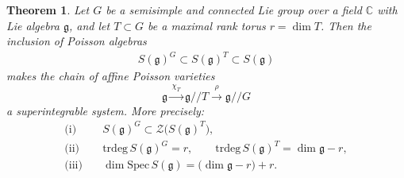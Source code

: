 \documentclass[11pt,reqno]{amsart}
\newtheorem*{theorem A}{Main Theorem A}
\newtheorem*{theorem B}{Main Theorem B}
\newtheorem*{theorem C}{Main Theorem C}
\newtheorem*{theorem D}{Main Theorem D}
\newtheorem{theorem}{Theorem}[section]
\theoremstyle{definition}
\theoremstyle{plain}
\theoremstyle{conclusion}
\begin{document}
\begin{theorem} 
\label{thm:superalchain}
Let $G$ be a semisimple and connected Lie group over a field $\mathbb{C}$ with Lie algebra $\mathfrak{g}$, and let $T\subset G$ be a maximal rank torus $r=\dim T$.  Then the inclusion of Poisson algebras\begin{align*}
S(\mathfrak{g})^G  \subset  S(\mathfrak{g})^T  \subset  S(\mathfrak{g})
\end{align*}makes the chain of affine Poisson varieties \begin{equation} 
\mathfrak{g}\xrightarrow{\,\chi_T\,}\mathfrak{g}//T \xrightarrow{\,\rho\,} \mathfrak{g}//G      \label{eq:chain}
\end{equation} a superintegrable system. More precisely:
\begin{align*}
\text{(i)}\quad & S(\mathfrak{g})^G \subset \mathcal{Z}\big(S(\mathfrak{g})^T\big),\\
\text{(ii)}\quad & \mathrm{trdeg} \, S(\mathfrak{g})^G=r,\qquad
\mathrm{trdeg} \, S(\mathfrak{g})^T=\dim\mathfrak{g} - r,\\
\text{(iii)}\quad & \dim\mathrm{Spec} \, S(\mathfrak{g}) =\bigl(\dim\mathfrak{g}-r\bigr)+r  .
\end{align*}
\end{theorem}
\end{document}
